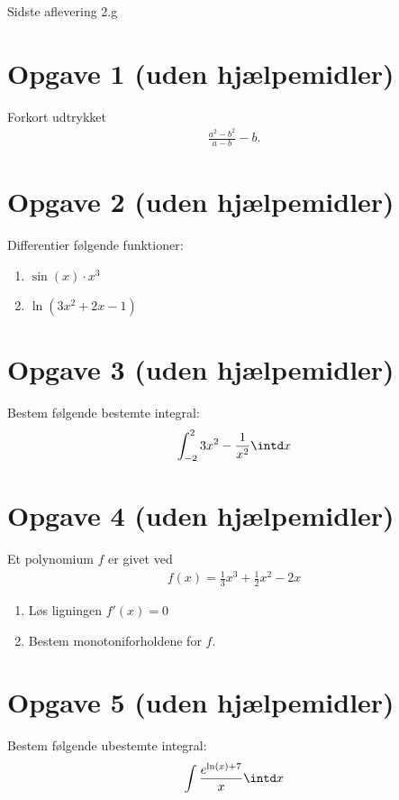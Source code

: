 \begin{center}
\Huge
Sidste aflevering 2.g
\end{center}
\section*{Opgave 1 (uden hjælpemidler)}
Forkort udtrykket
\begin{align*}
\frac{a^2-b^2}{a-b} -b.
\end{align*}

\section*{Opgave 2 (uden hjælpemidler)}

Differentier følgende funktioner:

\begin{enumerate}[label=\roman*)]
\item $\sin(x)\cdot x^3$
\item $\ln(3x^2+2x-1)$
\end{enumerate}


\section*{Opgave 3 (uden hjælpemidler)}
Bestem følgende bestemte integral:
\begin{align*}
\int_{-2}^2 3x^2 -\frac{1}{x^2} \intd x
\end{align*}

\section*{Opgave 4 (uden hjælpemidler)}
Et polynomium $f$ er givet ved
\begin{align*}
f(x) = \frac{1}{3}x^3+\frac{1}{2}x^2-2x
\end{align*} 
\begin{enumerate}[label=\roman*)]
\item Løs ligningen $f'(x) = 0$
\item Bestem monotoniforholdene for $f$.
\end{enumerate}

\section*{Opgave 5 (uden hjælpemidler)}

Bestem følgende ubestemte integral:
\begin{align*}
\int \frac{e^{\ln(x)+7}}{x} \intd x
\end{align*}

